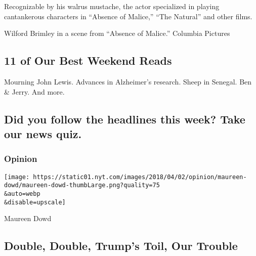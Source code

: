 Recognizable by his walrus mustache, the actor specialized in playing
cantankerous characters in ``Absence of Malice,'' ``The Natural'' and
other films.

\href{/2020/08/01/obituaries/wilford-brimley-dead.html}{}

Wilford Brimley in a scene from ``Absence of Malice.'' Columbia Pictures

\href{/2020/07/31/briefing/11-of-our-best-weekend-reads.html}{}

\hypertarget{11-of-our-best-weekend-reads}{%
\subsection{11 of Our Best Weekend
Reads}\label{11-of-our-best-weekend-reads}}

Mourning John Lewis. Advances in Alzheimer's research. Sheep in Senegal.
Ben \& Jerry. And more.

\href{/2020/07/31/briefing/11-of-our-best-weekend-reads.html}{}

\href{/interactive/2020/07/31/briefing/troops-baseball-louie-gohmert-news-quiz.html}{}

\hypertarget{did-you-follow-the-headlines-this-week-take-our-news-quiz}{%
\subsection{Did you follow the headlines this week? Take our news
quiz.}\label{did-you-follow-the-headlines-this-week-take-our-news-quiz}}

\href{https://www.nytimes.com/section/opinion?pagetype=Homepage\&action=click\&module=Opinion}{}

\hypertarget{opinion}{%
\subsubsection{Opinion}\label{opinion}}

\href{/2020/08/01/opinion/sunday/trump-coronavirus-herman-cain.html}{}

\texttt{[image: https://static01.nyt.com/images/2018/04/02/opinion/maureen-dowd/maureen-dowd-thumbLarge.png?quality=75\\\&auto=webp\\\&disable=upscale]}

Maureen Dowd

\hypertarget{double-double-trumps-toil-our-trouble}{%
\subsection{Double, Double, Trump's Toil, Our
Trouble}\label{double-double-trumps-toil-our-trouble}}

